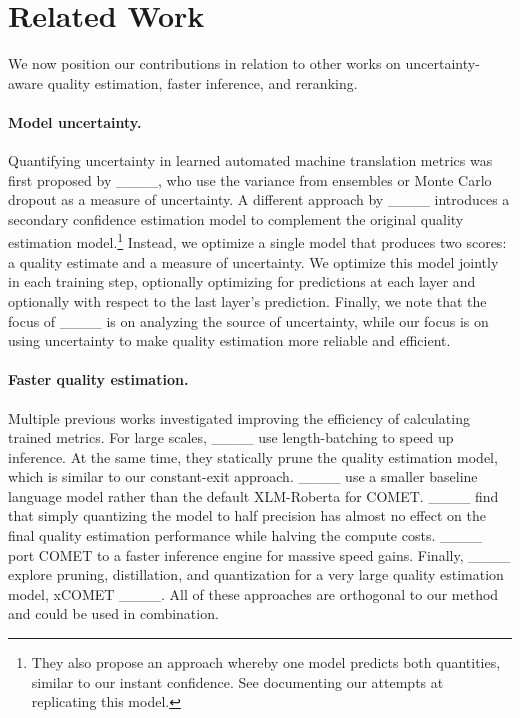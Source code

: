 \section{Related Work}
We now position our contributions in relation to other works on uncertainty-aware quality estimation, faster inference, and reranking.


\paragraph{Model uncertainty.}
Quantifying uncertainty in learned automated machine translation metrics was first proposed by ____, who use the variance from ensembles or Monte Carlo dropout as a measure of uncertainty.
A different approach by ____ introduces a secondary confidence estimation model to complement the original quality estimation model.\footnote{
They also propose an approach whereby one model predicts both quantities, similar to our instant confidence.
See  documenting our attempts at replicating this model.
}
Instead, we optimize a single model that produces two scores: a quality estimate and a measure of uncertainty.
We optimize this model jointly in each training step, optionally optimizing for predictions at each layer and optionally with respect to the last layer's prediction.
Finally, we note that the focus of ____ is on analyzing the source of uncertainty, while our focus is on using uncertainty to make quality estimation more reliable and efficient.

\paragraph{Faster quality estimation.}
Multiple previous works investigated improving the efficiency of calculating trained metrics.
For large scales, ____ use length-batching to speed up inference.
At the same time, they statically prune the quality estimation model, which is similar to our constant-exit approach.
____ use a smaller baseline language model rather than the default XLM-Roberta for COMET.
____ find that simply quantizing the model to half precision has almost no effect on the final quality estimation performance while halving the compute costs.
____ port COMET to a faster inference engine for massive speed gains.
Finally, ____ explore pruning, distillation, and quantization for a very large quality estimation model, xCOMET ____.
All of these approaches are orthogonal to our method
and could be used in combination.

